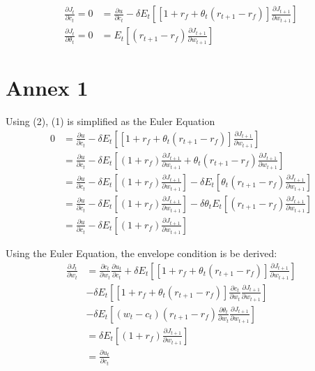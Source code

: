 \documentclass[]{article}
\begin{document}
\begin{align}
	\frac{\partial J_t}{\partial c_t} = 0 &= \frac{\partial u}{\partial c_t} - \delta E_t \left[\left[1 + r_f + \theta_t(r_{t+1}-r_f) \right]\frac{\partial J_{t+1}}{\partial w_{t+1}}\right]\\
	\frac{\partial J_t}{\partial \theta_t} = 0 &= E_t \left[(r_{t+1}-r_f) \frac{\partial J_{t+1}}{\partial w_{t+1}} \right]
\end{align}

\section{Annex 1}

Using (2), (1) is simplified as the Euler Equation
\begin{align*}
	0 &= \frac{\partial u}{\partial c_t} - \delta E_t \left[\left[1 + r_f + \theta_t(r_{t+1}-r_f) \right]\frac{\partial J_{t+1}}{\partial w_{t+1}}\right]\\
	&= \frac{\partial u}{\partial c_t} - \delta E_t \left[(1 + r_f) \frac{\partial J_{t+1}}{\partial w_{t+1}} + \theta_t(r_{t+1}-r_f) \frac{\partial J_{t+1}}{\partial w_{t+1}}\right] \\
	&= \frac{\partial u}{\partial c_t} - \delta E_t \left[(1 + r_f)\frac{\partial J_{t+1}}{\partial w_{t+1}} \right] - \delta E_t \left[ \theta_t(r_{t+1}-r_f) \frac{\partial J_{t+1}}{\partial w_{t+1}}\right] \\
	&= \frac{\partial u}{\partial c_t} - \delta E_t \left[(1 + r_f)\frac{\partial J_{t+1}}{\partial w_{t+1}} \right] - \delta \theta_t E_t \left[(r_{t+1}-r_f) \frac{\partial J_{t+1}}{\partial w_{t+1}}\right] \\
	&= \frac{\partial u}{\partial c_t} - \delta E_t \left[(1 + r_f)\frac{\partial J_{t+1}}{\partial w_{t+1}} \right]
\end{align*}

Using the Euler Equation, the envelope condition is be derived:
\begin{align*}
	\frac{\partial J_t}{\partial w_t} &= \frac{\partial c_t}{\partial w_t} \frac{\partial u_t}{\partial c_t} + \delta E_t \left[\left[1 + r_f + \theta_t(r_{t+1}-r_f) \right]\frac{\partial J_{t+1}}{\partial w_{t+1}}\right]\\
	&- \delta E_t \left[\left[1 + r_f + \theta_t(r_{t+1}-r_f) \right]\frac{\partial c_t}{\partial w_t}\frac{\partial J_{t+1}}{\partial w_{t+1}}\right]\\
	&- \delta E_t\left[(w_t - c_t)(r_{t+1}-r_f)\frac{\partial \theta_t}{\partial w_t}\frac{\partial J_{t+1}}{\partial w_{t+1}}\right]\\
	&= \delta E_t \left[(1 + r_f)\frac{\partial J_{t+1}}{\partial w_{t+1}} \right]\\
	&= \frac{\partial u_t}{\partial c_t}
\end{align*}
\end{document}
